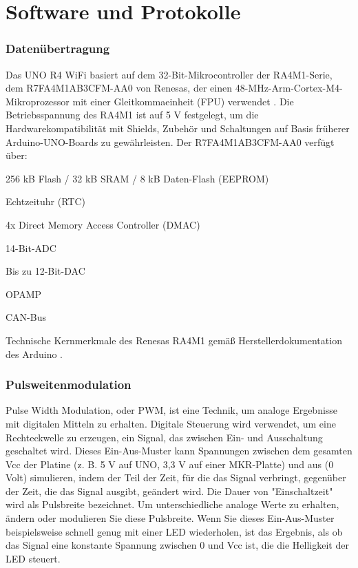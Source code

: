 \section{Software und Protokolle}

\subsubsection{Datenübertragung}

	Das UNO R4 WiFi basiert auf dem 32-Bit-Mikrocontroller der RA4M1-Serie, dem R7FA4M1AB3CFM-AA0 von Renesas, der einen 48-MHz-Arm-Cortex-M4-Mikroprozessor mit einer Gleitkommaeinheit (FPU) verwendet \cite{Arduino:2026}.
	Die Betriebsspannung des RA4M1 ist auf 5 V festgelegt, um die Hardwarekompatibilität mit Shields, Zubehör und Schaltungen auf Basis früherer Arduino-UNO-Boards zu gewährleisten.
	Der R7FA4M1AB3CFM-AA0 verfügt über:

\begin{itemize}{
		\item 256 kB Flash / 32 kB SRAM / 8 kB Daten-Flash (EEPROM)
		\item Echtzeituhr (RTC)
		\item 4x Direct Memory Access Controller (DMAC)
		\item 14-Bit-ADC
		\item Bis zu 12-Bit-DAC
		\item OPAMP
		\item CAN-Bus
} \end{itemize}
Technische Kernmerkmale des Renesas RA4M1 gemäß Herstellerdokumentation des Arduino \cite{Arduino:2026}.


\subsubsection{Pulsweitenmodulation}


	Pulse Width Modulation, oder PWM, ist eine Technik, um analoge Ergebnisse mit digitalen Mitteln zu erhalten. Digitale Steuerung wird verwendet, um eine Rechteckwelle zu erzeugen, ein Signal, das zwischen Ein- und Ausschaltung geschaltet wird. Dieses Ein-Aus-Muster kann Spannungen zwischen dem gesamten Vcc der Platine (z. B. 5 V auf UNO, 3,3 V auf einer MKR-Platte) und aus (0 Volt) simulieren, indem der Teil der Zeit, für die das Signal verbringt, gegenüber der Zeit, die das Signal ausgibt, geändert wird. Die Dauer von "Einschaltzeit" wird als Pulsbreite bezeichnet. Um unterschiedliche analoge Werte zu erhalten, ändern oder modulieren Sie diese Pulsbreite. Wenn Sie dieses Ein-Aus-Muster beispielsweise schnell genug mit einer LED wiederholen, ist das Ergebnis, als ob das Signal eine konstante Spannung zwischen 0 und Vcc ist, die die Helligkeit der LED steuert.

